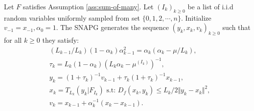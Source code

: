 \documentclass[12pt]{article}
\begin{document}
        \begin{definition}[SNAPG-V2]\label{def:snapg-v2}
            Let $F$ satisfies Assumption \ref{ass:sum-of-many}. 
            Let $(I_k)_{k \ge 0}$ be a list of i.i.d random variables uniformly sampled from set $\{0, 1, 2, \cdots, n\}$. 
            Initialize $v_{-1} = x_{-1}, \alpha_0 = 1$. 
            The SNAPG generates the sequence $(y_k, x_k, v_k)_{k \ge 0}$ such that for all $k \ge 0$ they satisfy: 
            \begin{align*}
                & (L_{k - 1}/L_k)(1 - \alpha_{k})\alpha_{k - 1}^2 = \alpha_{k}\left(\alpha_{k} - \mu/L_k\right), \\
                & \tau_k = L_k(1 - \alpha_k)\left(L_k \alpha_k - \mu^{(I_k)}\right)^{-1}, \\
                & y_k = (1 + \tau_k)^{-1}v_{k - 1} + \tau_k(1 + \tau_k)^{-1}x_{k - 1}, \\
                & x_k =  T_{L_k}(y_k | F_{I_k}) \text{ s.t: } D_f(x_k, y_k) \le L_k/2\Vert y_k - x_k\Vert^2, \\
                & v_k = x_{k - 1} + \alpha_k^{-1}(x_k - x_{k - 1}). 
            \end{align*}
        \end{definition}
\end{document}
